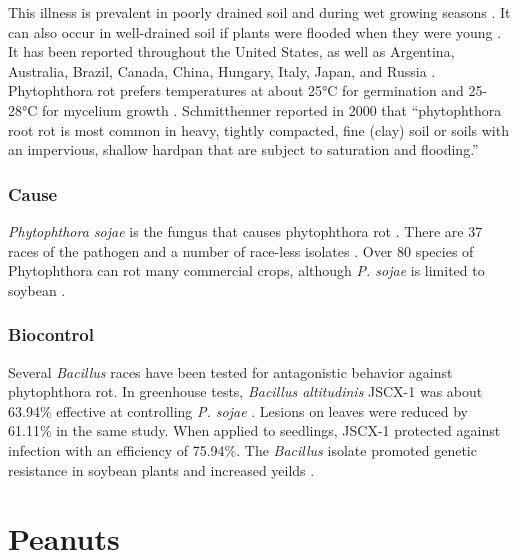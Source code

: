 \documentclass[letterpaper, 12pt]{report}
\begin{document}
This illness is prevalent in poorly drained soil and during wet growing seasons \autocite{dunleavy1966soybean}. It can also occur in well-drained soil if plants were flooded when they were young \autocite{schmitthenner2000phytophthora}. It has been reported throughout the United States, as well as Argentina, Australia, Brazil, Canada, China, Hungary, Italy, Japan, and Russia \autocite{schmitthenner2000phytophthora}. Phytophthora rot prefers temperatures at about 25°C for germination and 25-28°C for mycelium growth \autocite{schmitthenner2000phytophthora}. Schmitthenner reported in 2000 that ``phytophthora root rot is most common in heavy, tightly compacted, fine (clay) soil or soils with an impervious, shallow hardpan that are subject to saturation and flooding.''

\subsection{Cause}

\emph{Phytophthora sojae} is the fungus that causes phytophthora rot \autocite{dunleavy1966soybean}. There are 37 races of the pathogen and a number of race-less isolates \autocite{schmitthenner2000phytophthora}. Over 80 species of Phytophthora can rot many commercial crops, although \emph{P. sojae} is limited to soybean \autocite{tyler2007phytophthora}.

\subsection{Biocontrol}

Several \emph{Bacillus} races have been tested for antagonistic behavior against phytophthora rot. In greenhouse tests, \emph{Bacillus altitudinis} JSCX-1 was about 63.94\% effective at controlling \emph{P. sojae} \autocite{lu2017isolation}. Lesions on leaves were reduced by 61.11\% in the same study. When applied to seedlings, JSCX-1 protected against infection with an efficiency of 75.94\%. The \emph{Bacillus} isolate promoted genetic resistance in soybean plants and increased yeilds \autocite{lu2017isolation}.


\chapter{Peanuts}


\printbibliography[title=References]
\end{document}
